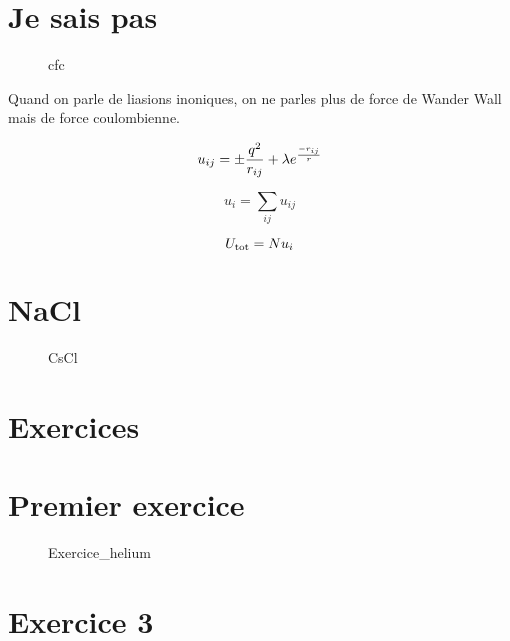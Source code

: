 


\section{Je sais pas}
\begin{figure}[ht]
    \centering
    \caption{cfc}
    \label{fig:cfc}
\end{figure}
Quand on parle de liasions inoniques, on ne parles plus de force de Wander Wall mais de force coulombienne.


$$u_{ij} =\pm \frac{q^2}{r_{ij}}+\lambda e^{-r_{ij}\over r}$$ 

$$u_i =\sum_{ij} u_{ij}$$ 

$$U_{\rm tot} = Nu_i$$ 


\section{NaCl}

\begin{figure}[h!]
    \centering
    \caption{CsCl}
    \label{fig:cscl}
\end{figure}

\section*{Exercices}

\section*{Premier exercice}

\begin{figure}[ht]
    \centering
    \caption{Exercice\_helium}
    \label{fig:exercice_helium}
\end{figure}

\section{Exercice 3}




